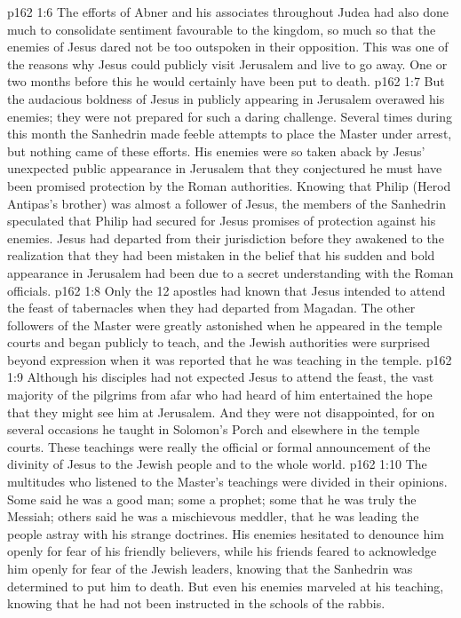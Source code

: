 \vs p162 1:6 The efforts of Abner and his associates throughout Judea had also done much to consolidate sentiment favourable to the kingdom, so much so that the enemies of Jesus dared not be too outspoken in their opposition. This was one of the reasons why Jesus could publicly visit Jerusalem and live to go away. One or two months before this he would certainly have been put to death.
\vs p162 1:7 But the audacious boldness of Jesus in publicly appearing in Jerusalem overawed his enemies; they were not prepared for such a daring challenge. Several times during this month the Sanhedrin made feeble attempts to place the Master under arrest, but nothing came of these efforts. His enemies were so taken aback by Jesus’ unexpected public appearance in Jerusalem that they conjectured he must have been promised protection by the Roman authorities. Knowing that Philip (Herod Antipas’s brother) was almost a follower of Jesus, the members of the Sanhedrin speculated that Philip had secured for Jesus promises of protection against his enemies. Jesus had departed from their jurisdiction before they awakened to the realization that they had been mistaken in the belief that his sudden and bold appearance in Jerusalem had been due to a secret understanding with the Roman officials.
\vs p162 1:8 Only the 12 apostles had known that Jesus intended to attend the feast of tabernacles when they had departed from Magadan. The other followers of the Master were greatly astonished when he appeared in the temple courts and began publicly to teach, and the Jewish authorities were surprised beyond expression when it was reported that he was teaching in the temple.
\vs p162 1:9 Although his disciples had not expected Jesus to attend the feast, the vast majority of the pilgrims from afar who had heard of him entertained the hope that they might see him at Jerusalem. And they were not disappointed, for on several occasions he taught in Solomon’s Porch and elsewhere in the temple courts. These teachings were really the official or formal announcement of the divinity of Jesus to the Jewish people and to the whole world.
\vs p162 1:10 The multitudes who listened to the Master’s teachings were divided in their opinions. Some said he was a good man; some a prophet; some that he was truly the Messiah; others said he was a mischievous meddler, that he was leading the people astray with his strange doctrines. His enemies hesitated to denounce him openly for fear of his friendly believers, while his friends feared to acknowledge him openly for fear of the Jewish leaders, knowing that the Sanhedrin was determined to put him to death. But even his enemies marveled at his teaching, knowing that he had not been instructed in the schools of the rabbis.
